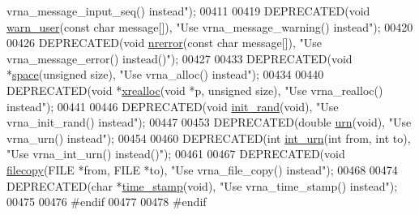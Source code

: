 \begin{DoxyCode}
{       vrna\_message\_input\_seq() instead"});
00411 
00419 DEPRECATED(\textcolor{keywordtype}{void} \hyperlink{utils_2basic_8h_af2355fa8746f2f30fbe71db65dea3d51}{warn\_user}(\textcolor{keyword}{const} \textcolor{keywordtype}{char} message[]), \textcolor{stringliteral}{"Use vrna\_message\_warning() instead"});
00420 
00426 DEPRECATED(\textcolor{keywordtype}{void} \hyperlink{utils_2basic_8h_a127ce946e56b5a5773781cabe68e38c5}{nrerror}(\textcolor{keyword}{const} \textcolor{keywordtype}{char} message[]), \textcolor{stringliteral}{"Use vrna\_message\_error() instead()"});
00427 
00433 DEPRECATED(\textcolor{keywordtype}{void} *\hyperlink{utils_2basic_8h_ad7e1e137b3bf1f7108933d302a7f0177}{space}(\textcolor{keywordtype}{unsigned} size), \textcolor{stringliteral}{"Use vrna\_alloc() instead"});
00434 
00440 DEPRECATED(\textcolor{keywordtype}{void} *\hyperlink{utils_2basic_8h_a9037ada838835b1b9db41581a021b0c8}{xrealloc}(\textcolor{keywordtype}{void} *p, \textcolor{keywordtype}{unsigned} size), \textcolor{stringliteral}{"Use vrna\_realloc() instead"});
00441 
00446 DEPRECATED(\textcolor{keywordtype}{void} \hyperlink{utils_2basic_8h_a8aaa6d9be6f803f496d9b97375c371f3}{init\_rand}(\textcolor{keywordtype}{void}), \textcolor{stringliteral}{"Use vrna\_init\_rand() instead"});
00447 
00453 DEPRECATED(\textcolor{keywordtype}{double} \hyperlink{utils_2basic_8h_aaa328491c84996e445d027fde9800f2e}{urn}(\textcolor{keywordtype}{void}), \textcolor{stringliteral}{"Use vrna\_urn() instead"});
00454 
00460 DEPRECATED(\textcolor{keywordtype}{int} \hyperlink{utils_2basic_8h_a68ff0849d44f62fe491800378a5ffcb4}{int\_urn}(\textcolor{keywordtype}{int} from, \textcolor{keywordtype}{int} to), \textcolor{stringliteral}{"Use vrna\_int\_urn() instead()"});
00461 
00467 DEPRECATED(\textcolor{keywordtype}{void} \hyperlink{utils_2basic_8h_ab213334ce977b6d21611cdea6b80c3bf}{filecopy}(FILE *from, FILE *to), \textcolor{stringliteral}{"Use vrna\_file\_copy() instead"});
00468 
00474 DEPRECATED(\textcolor{keywordtype}{char} *\hyperlink{utils_2basic_8h_a7afeb906cb36e9d77379eabc6907ac46}{time\_stamp}(\textcolor{keywordtype}{void}), \textcolor{stringliteral}{"Use vrna\_time\_stamp() instead"});
00475 
00476 \textcolor{preprocessor}{#endif}
00477 
00478 \textcolor{preprocessor}{#endif}
\end{DoxyCode}
